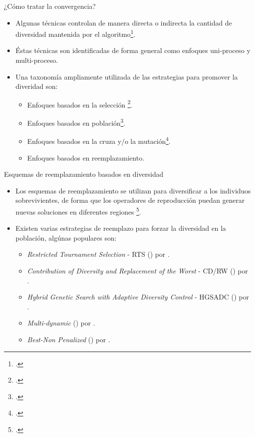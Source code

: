 \documentclass{beamer}
\begin{document}
\begin{frame}{¿Cómo tratar la convergencia?}
\begin{itemize}
\justifying
    \item Algunas técnicas controlan de manera directa o indirecta la cantidad de diversidad mantenida por el algoritmo\footcite{Crepinsek:13}.
    \item Éstas técnicas son identificadas de forma general como enfoques uni-proceso y multi-proceso.
    \item Una taxonomía ampliamente utilizada de las estrategias para promover la diveridad son:
    \begin{itemize}
        \item Enfoques basados en la selección \footcite{eiben2003introduction}.
        \item Enfoques basados en población\footcite{alba2005parallel}.
        \item Enfoques basados en la cruza y/o la mutación\footcite{yu2014differential}.
        \item Enfoques basados en reemplazamiento.
    \end{itemize}
\end{itemize}
\end{frame}


\begin{frame}{Esquemas de reemplazamiento basados en diversidad}
\begin{itemize}
    \item Los esquemas de reemplazamiento se utilizan para diversificar a los individuos sobrevivientes, de forma que los operadores de reproducción puedan generar nuevas soluciones en diferentes regiones \footcite{eiben1998evolutionary}.
    \item Existen varias estrategias de reemplazo para forzar la diversidad en la población, algúnas populares son:
    \begin{itemize}
    \scriptsize
       \item \textit{Restricted Tournament Selection} - RTS (\citeyear{harik1995finding}) por \citeauthor{harik1995finding}.
       \item \textit{Contribution of Diversity and Replacement of the Worst} - CD/RW (\citeyear{lozano2008replacement}) por \citeauthor{lozano2008replacement}.
       \item \textit{Hybrid Genetic Search with Adaptive Diversity Control} - HGSADC (\citeyear{vidal2013hybrid}) por \citeauthor{vidal2013hybrid}.
       \item \textit{Multi-dynamic} (\citeyear{segura2016novel}) por \citeauthor{segura2016novel}. 
       \item \textit{Best-Non Penalized} (\citeyear{romero2018memetic}) por \citeauthor{romero2018memetic}.
    \end{itemize}
\end{itemize}
\end{frame}
\end{document}

